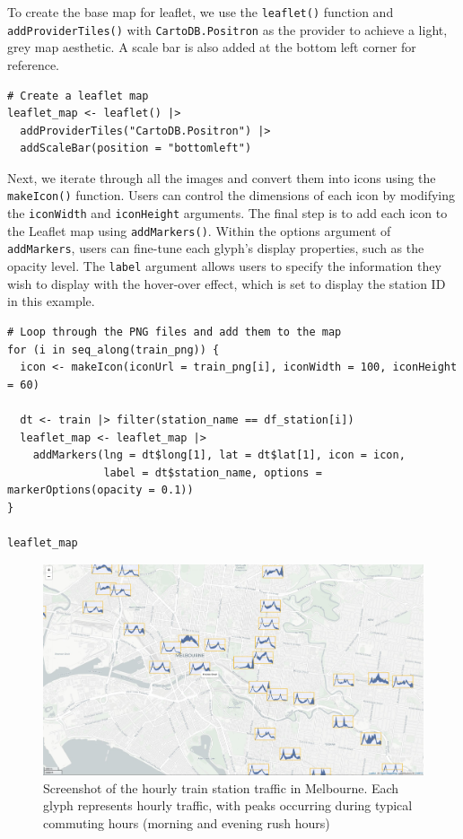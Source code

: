 To create the base map for leaflet, we use the \texttt{leaflet()} function and \texttt{addProviderTiles()} with \texttt{CartoDB.Positron} as the provider to achieve a light, grey map aesthetic. A scale bar is also added at the bottom left corner for reference.

\begin{verbatim}
# Create a leaflet map 
leaflet_map <- leaflet() |>
  addProviderTiles("CartoDB.Positron") |>
  addScaleBar(position = "bottomleft")
\end{verbatim}

Next, we iterate through all the images and convert them into icons using the \texttt{makeIcon()} function. Users can control the dimensions of each icon by modifying the \texttt{iconWidth} and \texttt{iconHeight} arguments. The final step is to add each icon to the Leaflet map using \texttt{addMarkers()}. Within the options argument of \texttt{addMarkers}, users can fine-tune each glyph's display properties, such as the opacity level. The \texttt{label} argument allows users to specify the information they wish to display with the hover-over effect, which is set to display the station ID in this example.

\begin{verbatim}
# Loop through the PNG files and add them to the map
for (i in seq_along(train_png)) {
  icon <- makeIcon(iconUrl = train_png[i], iconWidth = 100, iconHeight = 60)

  dt <- train |> filter(station_name == df_station[i])
  leaflet_map <- leaflet_map |>
    addMarkers(lng = dt$long[1], lat = dt$lat[1], icon = icon,
               label = dt$station_name, options = markerOptions(opacity = 0.1))
}

leaflet_map
\end{verbatim}

\begin{figure}

{\centering \includegraphics[width=1\linewidth]{figures/leaflet} 

}

\caption{Screenshot of the hourly train station traffic in Melbourne. Each glyph represents hourly traffic, with peaks occurring during typical commuting hours (morning and evening rush hours)}\label{fig:unnamed-chunk-19}
\end{figure}

